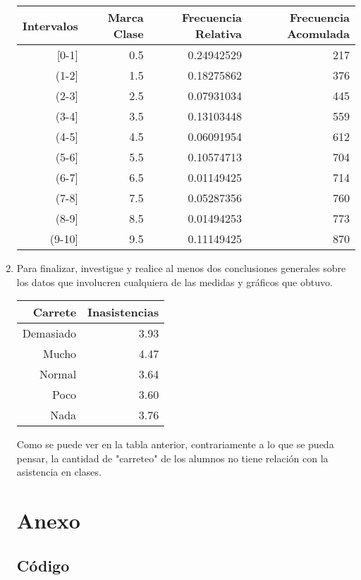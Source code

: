\documentclass[12pt,letterpaper,hidelinks]{article}
\begin{document}
\begin{enumerate}[\hspace{.5cm} a)]
\begin{table}[!ht]
\centering
\begin{tabular}{|rrrr|}
\hline
Intervalos & Marca Clase & Frecuencia Relativa & Frecuencia Acomulada \\ \hline
{[}0-1{]} & 0.5 & 0.24942529 & 217 \\
(1-2{]} & 1.5 & 0.18275862 & 376 \\
(2-3{]} & 2.5 & 0.07931034 & 445 \\
(3-4{]} & 3.5 & 0.13103448 & 559 \\
(4-5{]} & 4.5 & 0.06091954 & 612 \\
(5-6{]} & 5.5 & 0.10574713 & 704 \\
(6-7{]} & 6.5 & 0.01149425 & 714 \\
(7-8{]} & 7.5 & 0.05287356 & 760 \\
(8-9{]} & 8.5 & 0.01494253 & 773 \\
(9-10{]} & 9.5 & 0.11149425 & 870 \\
\hline
\end{tabular}
\end{table}

\pagebreak

\item Para finalizar, investigue y realice al menos dos conclusiones generales sobre los datos que involucren cualquiera de las medidas y gráficos que obtuvo.

\begin{table}[!ht]
\centering
\begin{tabular}{|rr|}
  \hline
Carrete & Inasistencias \\ 
  \hline
Demasiado & 3.93 \\ 
  Mucho & 4.47 \\ 
  Normal & 3.64 \\ 
  Poco & 3.60 \\ 
  Nada & 3.76 \\ 
   \hline
\end{tabular}
\end{table}

Como se puede ver en la tabla anterior, contrariamente a lo que se pueda pensar, la cantidad de "carreteo" de los alumnos no tiene relación con la asistencia en clases.

\pagebreak

\section{Anexo}

\subsection{Código}



\end{enumerate}
\end{document}

